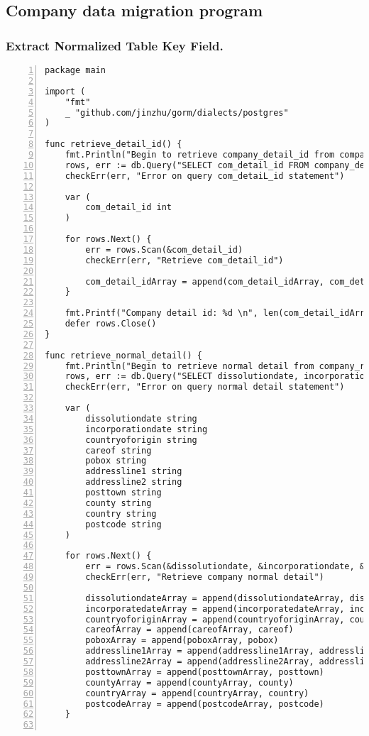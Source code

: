 \subsection {Company data migration program}

\subsubsection{Extract Normalized Table Key Field.}

\lstset{basicstyle=\ttfamily\tiny}  
\begin{lstlisting}[breaklines, frame=single, numbers=left, caption={Resource Table Key Retrieval Function.}, label=commandline-02]
package main

import (
	"fmt" 
	_ "github.com/jinzhu/gorm/dialects/postgres"
)

func retrieve_detail_id() {	
	fmt.Println("Begin to retrieve company_detail_id from company_detail")
	rows, err := db.Query("SELECT com_detail_id FROM company_detail;")
	checkErr(err, "Error on query com_detaiL_id statement")
	
	var ( 
		com_detail_id int 
	)
	
	for rows.Next() {
		err = rows.Scan(&com_detail_id)
		checkErr(err, "Retrieve com_detail_id")
		
		com_detail_idArray = append(com_detail_idArray, com_detail_id) 
	}
	
	fmt.Printf("Company detail id: %d \n", len(com_detail_idArray))
	defer rows.Close()
}

func retrieve_normal_detail() { 
	fmt.Println("Begin to retrieve normal detail from company_rawdata")
	rows, err := db.Query("SELECT dissolutiondate, incorporationdate, countryoforigin, careof, pobox, addressline1, addressline2, posttown, county, country, postcode FROM company_rawdata;")
	checkErr(err, "Error on query normal detail statement")
	
	var ( 
		dissolutiondate string 
		incorporationdate string 
		countryoforigin string 
		careof string 
		pobox string 
		addressline1 string 
		addressline2 string 
		posttown string 
		county string 
		country string 
		postcode string 
	)
	
	for rows.Next() {
		err = rows.Scan(&dissolutiondate, &incorporationdate, &countryoforigin, &careof, &pobox, &addressline1, &addressline2, &posttown, &county, &country, &postcode)
		checkErr(err, "Retrieve company normal detail")
		
		dissolutiondateArray = append(dissolutiondateArray, dissolutiondate)
		incorporatedateArray = append(incorporatedateArray, incorporationdate) 
		countryoforiginArray = append(countryoforiginArray, countryoforigin) 
		careofArray = append(careofArray, careof) 
		poboxArray = append(poboxArray, pobox) 
		addressline1Array = append(addressline1Array, addressline1) 
		addressline2Array = append(addressline2Array, addressline2) 
		posttownArray = append(posttownArray, posttown)  
		countyArray = append(countyArray, county) 
		countryArray = append(countryArray, country) 
		postcodeArray = append(postcodeArray, postcode)  
	}
	

\end{lstlisting}
